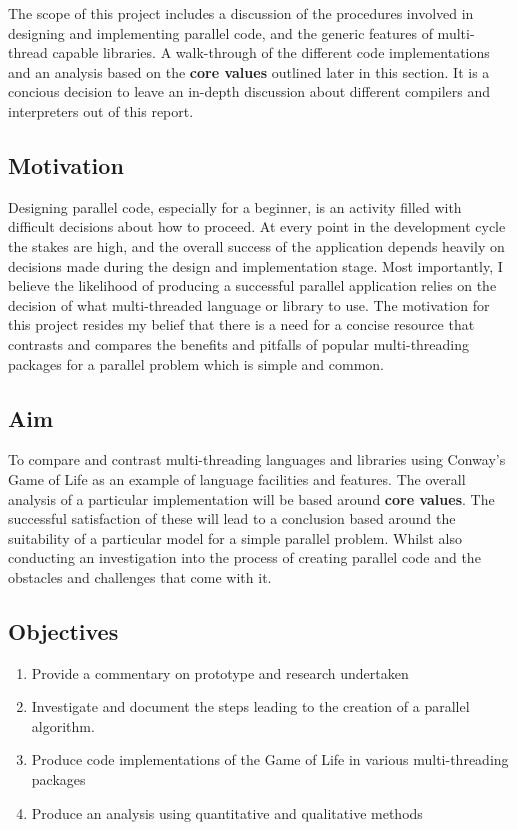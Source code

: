\documentclass[11pt]{article} %
\begin{document}
The scope of this project includes a discussion of the procedures involved in designing and implementing parallel code, and the generic features of multi-thread capable libraries. A walk-through of the different code implementations and an analysis based on the {\bf core values} outlined later in this section. It is a concious decision to leave an in-depth discussion about different compilers and interpreters out of this report.
\subsection{Motivation}
Designing parallel code, especially for a beginner, is an activity filled with difficult decisions about how to proceed. At every point in the development cycle the stakes are high, and the overall success of the application depends heavily on decisions made during the design and implementation stage. Most importantly, I believe the likelihood of producing a successful parallel application relies on the decision of what multi-threaded language or library to use. The motivation for this project resides my belief that there is a need for a concise resource that contrasts and compares the benefits and pitfalls of popular multi-threading packages for a parallel problem which is simple and common.
\subsection{Aim}
To compare and contrast multi-threading languages and libraries using Conway's Game of Life as an example of language facilities and features. The overall analysis of a particular implementation will be based around {\bf core values}. The successful satisfaction of these will lead to a conclusion based around the suitability of a particular model for a simple parallel problem. Whilst also conducting an investigation into the process of creating parallel code and the obstacles and challenges that come with it.
\subsection*{Objectives}
\begin{enumerate}
\item Provide a commentary on prototype and research undertaken
\item Investigate and document the steps leading to the creation of a parallel algorithm.
\item Produce code implementations of the Game of Life in various multi-threading packages
\item Produce an analysis using quantitative and qualitative methods
\setcounter{saveenum}{\value{enumi}}
\end{enumerate}
\end{document}

